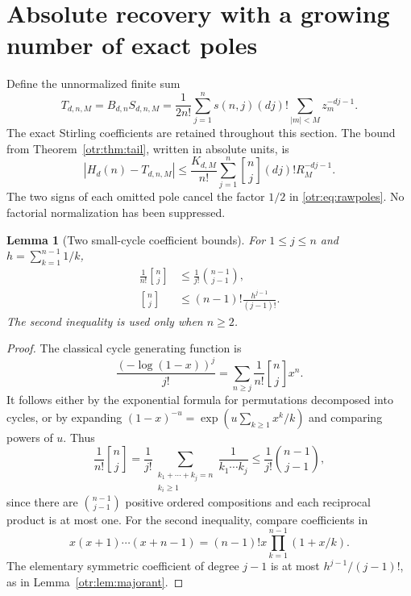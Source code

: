 \documentclass[11pt,a4paper]{article}
\newtheorem{lemma}[theorem]{Lemma}
\theoremstyle{definition}\newtheorem{definition}[theorem]{Definition}
\theoremstyle{remark}\newtheorem{remark}[theorem]{Remark}
\newcommand{\St}[2]{\genfrac{[}{]}{0pt}{}{#1}{#2}}
\begin{document}
\section{Absolute recovery with a growing number of exact poles}
\label{otr:sec:recovery}
Define the unnormalized finite sum
\begin{equation}\label{otr:eq:T}
 T_{d,n,M}=B_{d,n}S_{d,n,M}
 =\frac1{2n!}\sum_{j=1}^{n}s(n,j)(dj)!
       \sum_{|m|<M}z_m^{-dj-1}.
\end{equation}
The exact Stirling coefficients are retained throughout this section. The bound from Theorem~\ref{otr:thm:tail}, written in absolute units, is
\begin{equation}\label{otr:eq:absolutetail}
 |H_d(n)-T_{d,n,M}|
 \le\frac{K_{d,M}}{n!}\sum_{j=1}^{n}\St nj(dj)!R_M^{-dj-1}.
\end{equation}
The two signs of each omitted pole cancel the factor $1/2$ in \eqref{otr:eq:rawpoles}. No factorial normalization has been suppressed.

\begin{lemma}[Two small-cycle coefficient bounds]\label{otr:lem:smallcycles}
For $1\le j\le n$ and $h=\sum_{k=1}^{n-1}1/k$,
\begin{align}
 \frac1{n!}\St nj&\le\frac1{j!}\binom{n-1}{j-1},\label{otr:eq:composition}\\
 \St nj&\le(n-1)!\frac{h^{j-1}}{(j-1)!}.\label{otr:eq:harmonic}
\end{align}
The second inequality is used only when $n\ge2$.
\end{lemma}
\begin{proof}
The classical cycle generating function is
\[
 \frac{(-\log(1-x))^j}{j!}
 =\sum_{n\ge j}\frac1{n!}\St nj x^n.
\]
It follows either by the exponential formula for permutations decomposed into cycles, or by expanding
$(1-x)^{-u}=\exp(u\sum_{k\ge1}x^k/k)$ and comparing powers of $u$. Thus
\[
 \frac1{n!}\St nj
 =\frac1{j!}\sum_{\substack{k_1+\cdots+k_j=n\\k_i\ge1}}
                       \frac1{k_1\cdots k_j}
 \le\frac1{j!}\binom{n-1}{j-1},
\]
since there are $\binom{n-1}{j-1}$ positive ordered compositions and each reciprocal product is at most one. For the second inequality, compare coefficients in
\[
 x(x+1)\cdots(x+n-1)=(n-1)!x\prod_{k=1}^{n-1}(1+x/k).
\]
The elementary symmetric coefficient of degree $j-1$ is at most $h^{j-1}/(j-1)!$, as in Lemma~\ref{otr:lem:majorant}.
\end{proof}
\end{document}
